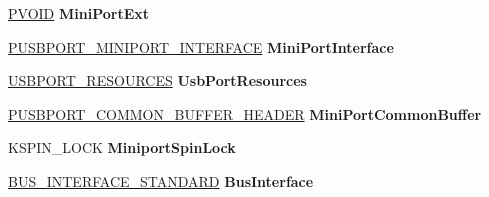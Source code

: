 \begin{DoxyCompactItemize}
\item 
\mbox{\label{struct___u_s_b_p_o_r_t___d_e_v_i_c_e___e_x_t_e_n_s_i_o_n_a079ea58fed987bef7341bec6629fb6a8}} 
\hyperlink{interfacevoid}{P\+V\+O\+ID} {\bfseries Mini\+Port\+Ext}
\item 
\mbox{\label{struct___u_s_b_p_o_r_t___d_e_v_i_c_e___e_x_t_e_n_s_i_o_n_a5864252241b91de004b0221fc8a5dca7}} 
\hyperlink{struct___u_s_b_p_o_r_t___m_i_n_i_p_o_r_t___i_n_t_e_r_f_a_c_e}{P\+U\+S\+B\+P\+O\+R\+T\+\_\+\+M\+I\+N\+I\+P\+O\+R\+T\+\_\+\+I\+N\+T\+E\+R\+F\+A\+CE} {\bfseries Mini\+Port\+Interface}
\item 
\mbox{\label{struct___u_s_b_p_o_r_t___d_e_v_i_c_e___e_x_t_e_n_s_i_o_n_a5ef35eb2d00a199dcbaf6f18d0647091}} 
\hyperlink{struct___u_s_b_p_o_r_t___r_e_s_o_u_r_c_e_s}{U\+S\+B\+P\+O\+R\+T\+\_\+\+R\+E\+S\+O\+U\+R\+C\+ES} {\bfseries Usb\+Port\+Resources}
\item 
\mbox{\label{struct___u_s_b_p_o_r_t___d_e_v_i_c_e___e_x_t_e_n_s_i_o_n_a5bf805b7e0642bf4440a72f9e95c30fa}} 
\hyperlink{struct___u_s_b_p_o_r_t___c_o_m_m_o_n___b_u_f_f_e_r___h_e_a_d_e_r}{P\+U\+S\+B\+P\+O\+R\+T\+\_\+\+C\+O\+M\+M\+O\+N\+\_\+\+B\+U\+F\+F\+E\+R\+\_\+\+H\+E\+A\+D\+ER} {\bfseries Mini\+Port\+Common\+Buffer}
\item 
\mbox{\label{struct___u_s_b_p_o_r_t___d_e_v_i_c_e___e_x_t_e_n_s_i_o_n_a2bfbc773035c546248881558cb8d1d9f}} 
K\+S\+P\+I\+N\+\_\+\+L\+O\+CK {\bfseries Miniport\+Spin\+Lock}
\item 
\mbox{\label{struct___u_s_b_p_o_r_t___d_e_v_i_c_e___e_x_t_e_n_s_i_o_n_a8e44499a077f4f78622c1f6189755a49}} 
\hyperlink{struct___b_u_s___i_n_t_e_r_f_a_c_e___s_t_a_n_d_a_r_d}{B\+U\+S\+\_\+\+I\+N\+T\+E\+R\+F\+A\+C\+E\+\_\+\+S\+T\+A\+N\+D\+A\+RD} {\bfseries Bus\+Interface}
\item 
\mbox{\label{struct___u_s_b_p_o_r_t___d_e_v_i_c_e___e_x_t_e_n_s_i_o_n_a14b3045a8f2cd2b74e4a1e1b40b7bdd9}} 

\end{DoxyCompactItemize}

